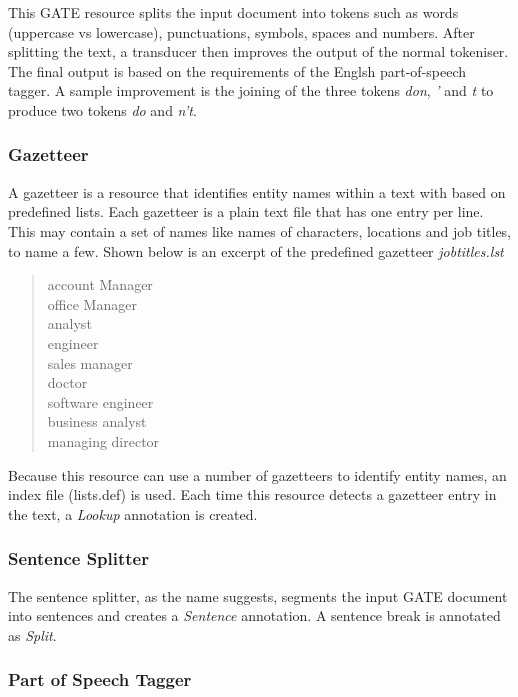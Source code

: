 This GATE resource splits the input document into tokens such as words (uppercase vs lowercase), punctuations, symbols, spaces and numbers. After splitting the text, a transducer then improves the output of the normal tokeniser. The final output is based on the requirements of the Englsh part-of-speech tagger. A sample improvement is the joining of the three tokens \textit{don}, \textit{'} and \textit{t} to produce two tokens \textit{do} and \textit{n't}.

\subsubsection{Gazetteer}
\label{sec:gazetteer}

A gazetteer is a resource that identifies entity names within a text with based on predefined lists. Each gazetteer is a plain text file that has one entry per line. This may contain a set of names like names of characters, locations and job titles, to name a few. Shown below is an excerpt of the predefined gazetteer \textit{jobtitles.lst}

\begin{verse}
account Manager \\
office Manager\\
analyst\\
engineer\\
sales manager\\
doctor\\
software engineer\\
business analyst\\
managing director\\
\end{verse}

Because this resource can use a number of gazetteers to identify entity names, an index file (lists.def) is used. Each time this resource detects a gazetteer entry in the text, a \textit{Lookup} annotation is created.

\subsubsection{Sentence Splitter}
\label{sec:sentencesplitter}

The sentence splitter, as the name suggests, segments the input GATE document into sentences and creates a \textit{Sentence} annotation. A sentence break is annotated as \textit{Split}. 

\subsubsection{Part of Speech Tagger}
\label{sec:pos}

